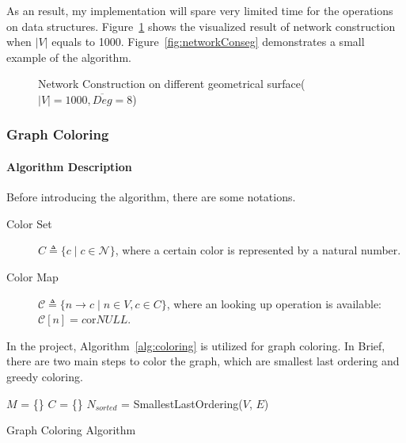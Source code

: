 \documentclass[prodmode,acmtecs]{acmsmall} %
\begin{document}
As an result, my implementation will spare very limited time for the operations on data structures. Figure~\ref{fig:networkCons} shows the visualized result of network construction when $|V|$ equals to 1000. Figure~\ref{fig:networkConseg} demonstrates a small example of the algorithm.
\begin{figure}
\centerline{
}
\caption{Network Construction on different geometrical surface( $|V| = 1000, \overline{Deg} = 8$)}
\label{fig:networkCons}
\end{figure}
\subsubsection{Graph Coloring}
\paragraph{Algorithm Description}
Before introducing the algorithm, there are some notations.
\begin{description}
\item[Color Set] 
$C \triangleq \{c \mid c\in\mathcal{N}\}$, where a certain color is represented by a natural number. 
\item[Color Map]
$\mathcal{C} \triangleq \{n \to c \mid n\in{V}, c\in{C}\}$, where an looking up operation is available: $\mathcal{C}[n] = c \text{or} NULL$.
\end{description}
In the project, Algorithm~\ref{alg:coloring}\cite{Matula:1983:SOC:2402.322385} is utilized for graph coloring. In Brief, there are two main steps to color the graph, which are smallest last ordering and greedy coloring.

\begin{algorithm}[t]
\SetAlgoNoLine
{}
$M$ = \{\}\;
$C$ = \{\}\;
$N_{sorted}$ = SmallestLastOrdering($V$, $E$)\;
\caption{Graph Coloring Algorithm}
\label{alg:coloring}
\end{algorithm}
\end{document}
